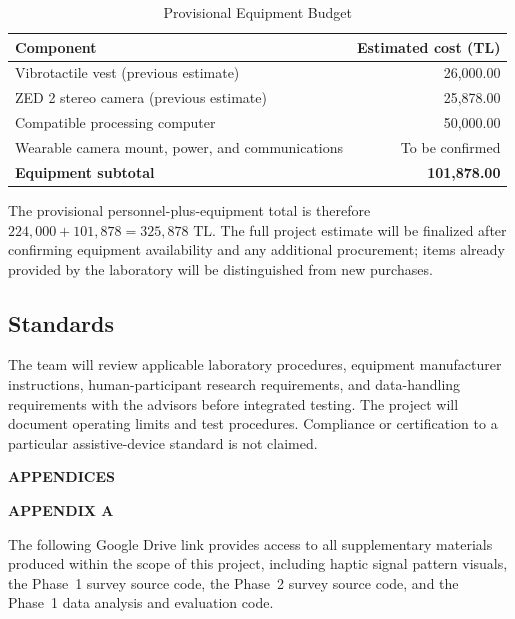 \documentclass[12pt]{report}
\begin{document}
\begin{table}[htbp]
\centering
\caption{Provisional Equipment Budget}
\label{tab:cost}
\begin{tabular}{l r}
\hline
\textbf{Component} & \textbf{Estimated cost (TL)}\\
\hline
Vibrotactile vest (previous estimate) & 26,000.00\\
ZED 2 stereo camera (previous estimate) & 25,878.00\\
Compatible processing computer & 50,000.00\\
Wearable camera mount, power, and communications & To be confirmed\\
\hline
\textbf{Equipment subtotal} & \textbf{101,878.00}\\
\hline
\end{tabular}
\end{table}

The provisional personnel-plus-equipment total is therefore $224{,}000 + 101{,}878 = \boxed{325{,}878 \text{ TL}}$. The full project estimate will be finalized after confirming equipment availability and any additional procurement; items already provided by the laboratory will be distinguished from new purchases.

\subsection{Standards}

The team will review applicable laboratory procedures, equipment manufacturer instructions, human-participant research requirements, and data-handling requirements with the advisors before integrated testing. The project will document operating limits and test procedures. Compliance or certification to a particular assistive-device standard is not claimed.

\clearpage
\thispagestyle{fancy}
\vspace*{\fill}
\begin{center}
\textbf{APPENDICES}
\end{center}
\vspace*{\fill}

\clearpage
\thispagestyle{fancy}
\begin{center}
\textbf{APPENDIX A}
\end{center}

\noindent The following Google Drive link provides access to all supplementary materials produced within the scope of this project, including haptic signal pattern visuals, the Phase~1 survey source code, the Phase~2 survey source code, and the Phase~1 data analysis and evaluation code.
\end{document}
